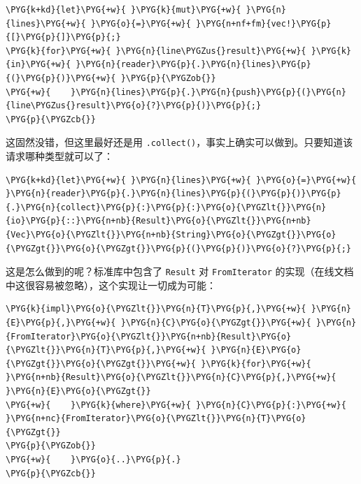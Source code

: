 \begin{Verbatim}[commandchars=\\\{\},breaklines=true,breakanywhere=true,fontsize=\codefont,xleftmargin=17bp]
\PYG{k+kd}{let}\PYG{+w}{ }\PYG{k}{mut}\PYG{+w}{ }\PYG{n}{lines}\PYG{+w}{ }\PYG{o}{=}\PYG{+w}{ }\PYG{n+nf+fm}{vec!}\PYG{p}{[}\PYG{p}{]}\PYG{p}{;}
\PYG{k}{for}\PYG{+w}{ }\PYG{n}{line\PYGZus{}result}\PYG{+w}{ }\PYG{k}{in}\PYG{+w}{ }\PYG{n}{reader}\PYG{p}{.}\PYG{n}{lines}\PYG{p}{(}\PYG{p}{)}\PYG{+w}{ }\PYG{p}{\PYGZob{}}
\PYG{+w}{    }\PYG{n}{lines}\PYG{p}{.}\PYG{n}{push}\PYG{p}{(}\PYG{n}{line\PYGZus{}result}\PYG{o}{?}\PYG{p}{)}\PYG{p}{;}
\PYG{p}{\PYGZcb{}}
\end{Verbatim}

这固然没错，但这里最好还是用 \texttt{.collect()}，事实上确实可以做到。只要知道该请求哪种类型就可以了：

\begin{Verbatim}[commandchars=\\\{\},breaklines=true,breakanywhere=true,fontsize=\codefont,xleftmargin=17bp]
\PYG{k+kd}{let}\PYG{+w}{ }\PYG{n}{lines}\PYG{+w}{ }\PYG{o}{=}\PYG{+w}{ }\PYG{n}{reader}\PYG{p}{.}\PYG{n}{lines}\PYG{p}{(}\PYG{p}{)}\PYG{p}{.}\PYG{n}{collect}\PYG{p}{:}\PYG{p}{:}\PYG{o}{\PYGZlt{}}\PYG{n}{io}\PYG{p}{::}\PYG{n+nb}{Result}\PYG{o}{\PYGZlt{}}\PYG{n+nb}{Vec}\PYG{o}{\PYGZlt{}}\PYG{n+nb}{String}\PYG{o}{\PYGZgt{}}\PYG{o}{\PYGZgt{}}\PYG{o}{\PYGZgt{}}\PYG{p}{(}\PYG{p}{)}\PYG{o}{?}\PYG{p}{;}
\end{Verbatim}

这是怎么做到的呢？标准库中包含了 \texttt{Result} 对 \texttt{FromIterator} 的实现（在线文档中这很容易被忽略），这个实现让一切成为可能：

\begin{Verbatim}[commandchars=\\\{\},breaklines=true,breakanywhere=true,fontsize=\codefont,xleftmargin=17bp]
\PYG{k}{impl}\PYG{o}{\PYGZlt{}}\PYG{n}{T}\PYG{p}{,}\PYG{+w}{ }\PYG{n}{E}\PYG{p}{,}\PYG{+w}{ }\PYG{n}{C}\PYG{o}{\PYGZgt{}}\PYG{+w}{ }\PYG{n}{FromIterator}\PYG{o}{\PYGZlt{}}\PYG{n+nb}{Result}\PYG{o}{\PYGZlt{}}\PYG{n}{T}\PYG{p}{,}\PYG{+w}{ }\PYG{n}{E}\PYG{o}{\PYGZgt{}}\PYG{o}{\PYGZgt{}}\PYG{+w}{ }\PYG{k}{for}\PYG{+w}{ }\PYG{n+nb}{Result}\PYG{o}{\PYGZlt{}}\PYG{n}{C}\PYG{p}{,}\PYG{+w}{ }\PYG{n}{E}\PYG{o}{\PYGZgt{}}
\PYG{+w}{    }\PYG{k}{where}\PYG{+w}{ }\PYG{n}{C}\PYG{p}{:}\PYG{+w}{ }\PYG{n+nc}{FromIterator}\PYG{o}{\PYGZlt{}}\PYG{n}{T}\PYG{o}{\PYGZgt{}}
\PYG{p}{\PYGZob{}}
\PYG{+w}{    }\PYG{o}{..}\PYG{p}{.}
\PYG{p}{\PYGZcb{}}
\end{Verbatim}

